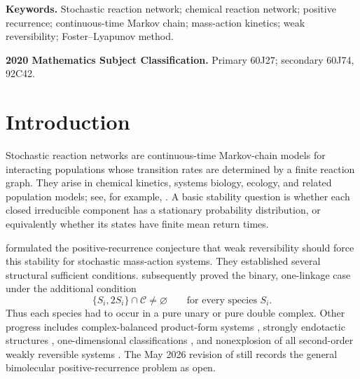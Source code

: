 \begin{abstract}
We prove that every finite bimolecular weakly reversible stochastic
mass-action network with one linkage class is positive recurrent on each
closed communicating class, for every positive choice of rate constants.
This removes the hypothesis in the 2020 theorem of Anderson, Cappelletti,
and Kim that each species occurs in a unary or double complex.  The proof
marks the target complex of the actual reaction channel that most recently
fired and applies a log-factorial potential to the population remaining after
that target is removed.  Its increment is exactly a target/source
falling-factorial ratio.  Finite target-following paths propagate the negative
reward of a rare terminal source, while a normalized-log compactification and
an exhaustive bimolecular top-complex alternative make that terminal source
available along every divergent sequence unless a linear stoichiometric
invariant already bounds the sequence.
\end{abstract}

\noindent\textbf{Keywords.}
Stochastic reaction network; chemical reaction network; positive recurrence;
continuous-time Markov chain; mass-action kinetics; weak reversibility;
Foster--Lyapunov method.

\medskip
\noindent\textbf{2020 Mathematics Subject Classification.}
Primary 60J27; secondary 60J74, 92C42.

\section{Introduction}\label{sec:intro}

Stochastic reaction networks are continuous-time Markov-chain models for
interacting populations whose transition rates are determined by a finite
reaction graph.  They arise in chemical kinetics, systems biology, ecology,
and related population models; see, for example,
\citet{AndersonKurtz2015}.  A basic stability question is whether each closed
irreducible component has a stationary probability distribution, or
equivalently whether its states have finite mean return times.

\citet{AndersonKim2018} formulated the positive-recurrence conjecture that
weak reversibility should force this stability for stochastic mass-action
systems.  They established several structural sufficient conditions.
\citet{AndersonCappellettiKim2020} subsequently proved the binary,
one-linkage case under the additional condition
\begin{equation}\label{eq:ACK-condition}
  \{S_i,2S_i\}\cap\mathcal C\ne\varnothing
  \qquad\text{for every species }S_i.
\end{equation}
Thus each species had to occur in a pure unary or pure double complex.  Other
progress includes complex-balanced product-form systems
\citep{AndersonCraciunKurtz2010}, strongly endotactic structures
\citep{AndersonCappellettiKimNguyen2020}, one-dimensional classifications
\citep{WiufXu2023}, and nonexplosion of all second-order weakly reversible
systems \citep{Xu2026}.  The May 2026 revision of \citet{Xu2026} still records
the general bimolecular positive-recurrence problem as open.

